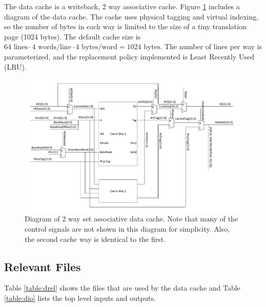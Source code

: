 The data cache is a writeback, 2 way associative cache. 
Figure \ref{fig:dcachediag} includes a diagram of the data cache.
The cache uses physical tagging and virtual indexing, so the number of bytes in each way is limited to the size of a tiny translation page (1024 bytes). 
The default cache size is $64 \text{ lines} \cdot 4 \text{ words/line} \cdot 4 \text{ bytes/word} = 1024 \text{ bytes}$. 
The number of lines per way is parameterized, and the replacement policy implemented is Least Recently Used (LRU).

	\begin{figure}
	\centering
	\includegraphics[width=\textwidth]{diagrams/data_cache.pdf}
	\caption{Diagram of 2 way set associative data cache. Note that many of the control signals are not shown in this diagram for simplicity. Also, the second cache way is identical to the first.}
	\label{fig:dcachediag}
	\end{figure}

\subsection{Relevant Files}

	Table \ref{table:drel} shows the files that are used by the data cache and Table \ref{table:dio} lists the top level inputs and outputs.

